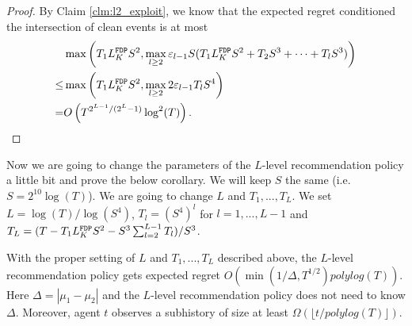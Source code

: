 \begin{proof}
By Claim \ref{clm:l2_exploit}, we know that the expected regret conditioned the intersection of clean events is at most 
\begin{align*}
&\max\left( T_1L^\mathtt{FDP}_K S^2 , \max_{l \geq 2} \varepsilon_{l-1}S(T_1L^\mathtt{FDP}_K S^2 + T_2 S^3 + \cdots + T_lS^3)\right) \\
\leq & \max\left( T_1L^\mathtt{FDP}_K S^2 , \max_{l \geq 2} 2 \varepsilon_{l-1} T_l S^4 \right)\\
= &O\left(T^{2^{L-1}/(2^L-1)} \log^2(T) \right).
\end{align*}
\end{proof}

Now we are going to change the parameters of the $L$-level recommendation policy a little bit and prove the below corollary. We will keep $S$ the same (i.e. $S = 2^{10}\log(T)$). We are going to change $L$ and $T_1,...,T_L$. We set $L = \log(T)/\log(S^4)$, $T_l = (S^4)^l$ for $l=1,...,L-1$ and $T_L = (T - T_1 L^\mathtt{FDP}_K S^2 - S^3\sum_{l=2}^{L-1} T_l)/S^3$.  

\begin{corollary}
\label{cor:llevel}
With the proper setting of $L$ and $T_1,...,T_L$ described above, the $L$-level recommendation policy gets expected regret $O(\min(1/\Delta, T^{1/2})polylog(T))$. Here $\Delta = |\mu_1 -\mu_2|$ and the $L$-level recommendation policy does not need to know $\Delta$. Moreover, agent $t$ observes a subhistory of size at least $\Omega( \lfloor t/polylog(T)\rfloor)$. 
\end{corollary}

